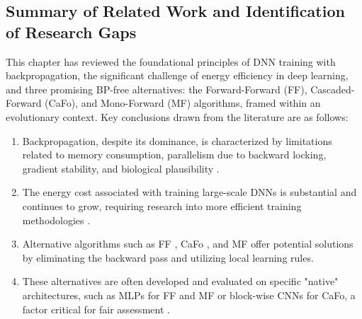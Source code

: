 \subsection{Summary of Related Work and Identification of Research Gaps}
\label{sec:research_gaps_chap2}
This chapter has reviewed the foundational principles of DNN training with backpropagation, the significant challenge of energy efficiency in deep learning, and three promising BP-free alternatives: the Forward-Forward (FF), Cascaded-Forward (CaFo), and Mono-Forward (MF) algorithms, framed within an evolutionary context.
Key conclusions drawn from the literature are as follows:
\begin{enumerate}
\item Backpropagation, despite its dominance, is characterized by limitations related to memory consumption, parallelism due to backward locking, gradient stability, and biological plausibility \cite{lillicrap2020backpropagation, bengio2015towards, jaderberg2017decoupled}.
\item The energy cost associated with training large-scale DNNs is substantial and continues to grow, requiring research into more efficient training methodologies \cite{strubell2019energy, patterson2021carbon, wef2024growing}.
\item Alternative algorithms such as FF \cite{hinton2022forward}, CaFo \cite{zhao2023cafo}, and MF \cite{gong2025mono} offer potential solutions by eliminating the backward pass and utilizing local learning rules.
\item These alternatives are often developed and evaluated on specific "native" architectures, such as MLPs for FF and MF or block-wise CNNs for CaFo, a factor critical for fair assessment \cite{hinton2022forward, zhao2023cafo, gong2025mono}.
\end{enumerate}
\pagebreak

